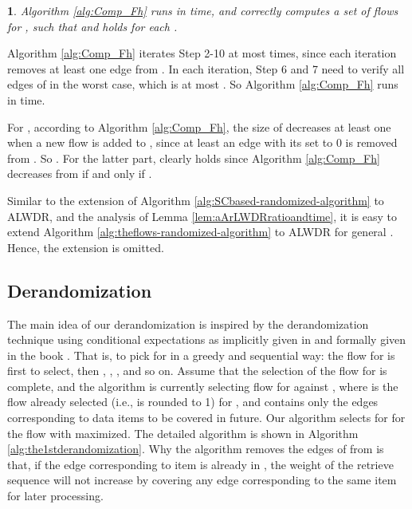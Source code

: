\documentclass[11pt,english,onecolumn,draftcls]{IEEEtran}
\theoremstyle{plain}
\theoremstyle{plain}
\theoremstyle{plain}
\newtheorem{lem}[thm]{\protect\lemmaname}
\theoremstyle{plain}
\providecommand{\lemmaname}{Lemma}
\begin{document}
\begin{lem}
\label{lem:timeofcompFh}Algorithm \ref{alg:Comp_Fh} runs in 
time, and correctly computes a set of flows 
for , such that 
and  holds for each .\end{lem}
\begin{IEEEproof}
Algorithm \ref{alg:Comp_Fh} iterates Step 2-10 at most 
times, since each iteration removes at least one edge from .
In each iteration, Step 6 and 7 need to verify all edges of 
in the worst case, which is at most . So Algorithm \ref{alg:Comp_Fh}
runs in  time.

For , according to Algorithm \ref{alg:Comp_Fh},
the size of  decreases at least one when a new flow is added
to , since at least an edge  with its 
set to 0 is removed from . So .
For the latter part,  clearly
holds since Algorithm \ref{alg:Comp_Fh} decreases  from
 if and only if .
\end{IEEEproof}
Similar to the extension of Algorithm \ref{alg:SCbased-randomized-algorithm}
to ALWDR, and the analysis of Lemma \ref{lem:aArLWDRratioandtime},
it is easy to extend Algorithm \ref{alg:theflows-randomized-algorithm}
to ALWDR for general . Hence, the extension
is omitted.


\subsection{Derandomization}

The main idea of our derandomization is inspired by the derandomization
technique using conditional expectations as implicitly given in \cite{erdos1973combinatorial}
and formally given in the book \cite{spencer1987ten}. That is, to
pick  for  in a greedy and sequential way:
the flow for  is first to select, then ,
, , and so on. Assume that the selection
of the flow for  is complete,
and the algorithm is currently selecting flow for 
against ,
where  is the flow already selected (i.e., 
is rounded to 1) for , and  contains only
the edges corresponding to data items to be covered in future. Our
algorithm selects for  for the flow 
with  maximized. The detailed
algorithm is shown in Algorithm \ref{alg:the1stderandomization}.
Why the algorithm removes the edges of 
from  is that, if the edge corresponding to item 
is already in , the weight of the retrieve
sequence will not increase by covering any edge corresponding to the
same item  for later processing.
\end{document}
